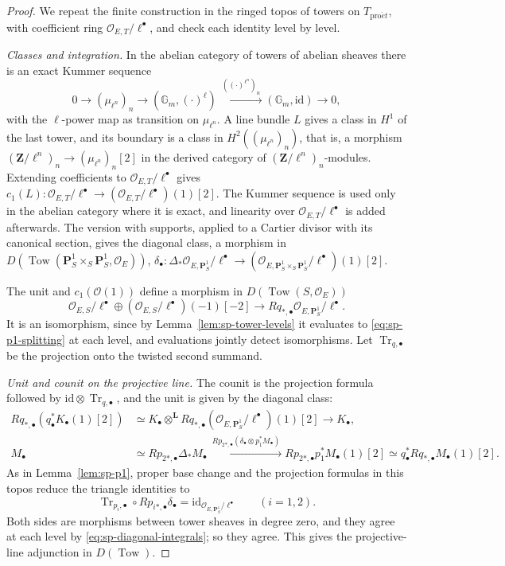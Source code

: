 \documentclass[11pt,a4paper]{article}
\numberwithin{equation}{section}
\theoremstyle{definition}
\theoremstyle{remark}
\newcommand{\proet}{\mathrm{pro}\acute{e}t}
\begin{document}
\begin{proof}
We repeat the finite construction in the ringed topos of towers on
$T_{\proet}$, with coefficient ring $\mathcal O_{E,T}/\ell^\bullet$,
and check each identity level by level.

\emph{Classes and integration.} In the abelian category of towers of
abelian sheaves there is an exact Kummer sequence
\[
 0\longrightarrow(\mu_{\ell^n})_n
 \longrightarrow(\mathbb G_m,(\cdot)^\ell)
 \xrightarrow{\ ((\cdot)^{\ell^n})_n\ }
 (\mathbb G_m,\mathrm{id})\longrightarrow0,
\]
with the $\ell$-power map as transition on $\mu_{\ell^n}$. A line bundle
$L$ gives a class in $H^1$ of the last tower, and its boundary is a class
in $H^2((\mu_{\ell^n})_n)$, that is, a morphism
$(\mathbf Z/\ell^n)_n\to(\mu_{\ell^n})_n[2]$ in the derived category of
$(\mathbf Z/\ell^n)_n$-modules. Extending coefficients to $\mathcal O_{E,T}/\ell^\bullet$ gives
$c_1(L):\mathcal O_{E,T}/\ell^\bullet\to (\mathcal O_{E,T}/\ell^\bullet)(1)[2]$. The Kummer sequence is used only in the
abelian category where it is exact, and linearity over $\mathcal O_{E,T}/\ell^\bullet$ is added
afterwards. The version with supports, applied to a Cartier divisor with
its canonical section, gives the diagonal class, a morphism in
$D(\operatorname{Tow}(\mathbf P^1_S\times_S\mathbf P^1_S,\mathcal O_E))$,
$\delta_\bullet:\Delta_*\mathcal O_{E,\mathbf P^1_S}/\ell^\bullet\to
(\mathcal O_{E,\mathbf P^1_S\times_S\mathbf P^1_S}/\ell^\bullet)(1)[2]$.

The unit and $c_1(\mathcal O(1))$ define a morphism in
$D(\operatorname{Tow}(S,\mathcal O_E))$
\[
 \mathcal O_{E,S}/\ell^\bullet\oplus (\mathcal O_{E,S}/\ell^\bullet)(-1)[-2]\longrightarrow
 Rq_{*,\bullet}\mathcal O_{E,\mathbf P^1_S}/\ell^\bullet.
\]
It is an isomorphism, since by Lemma~\ref{lem:sp-tower-levels} it
evaluates to \eqref{eq:sp-p1-splitting} at each level, and evaluations
jointly detect isomorphisms. Let $\operatorname{Tr}_{q,\bullet}$ be the
projection onto the twisted second summand.

\emph{Unit and counit on the projective line.} The counit is the
projection formula followed by $\mathrm{id}\otimes\operatorname{Tr}_{q,\bullet}$,
and the unit is given by the diagonal class:
\[
 \begin{aligned}
 Rq_{*,\bullet}(q_\bullet^*K_\bullet(1)[2])
 &\simeq K_\bullet\otimes^{\mathbf L}
 Rq_{*,\bullet}(\mathcal O_{E,\mathbf P^1_S}/\ell^\bullet)(1)[2]
 \longrightarrow K_\bullet,\\
 M_\bullet&\simeq Rp_{2*,\bullet}\Delta_*M_\bullet
 \xrightarrow{\ Rp_{2*,\bullet}(\delta_\bullet\otimes p_1^*M_\bullet)\ }
 Rp_{2*,\bullet}p_1^*M_\bullet(1)[2]
 \simeq q_\bullet^*Rq_{*,\bullet}M_\bullet(1)[2].
 \end{aligned}
\]
As in Lemma~\ref{lem:sp-p1}, proper base change and the projection
formulas in this topos reduce the triangle identities to
\[
 \operatorname{Tr}_{p_i,\bullet}\circ Rp_{i*,\bullet}\delta_\bullet
 =\mathrm{id}_{\mathcal O_{E,\mathbf P^1_S}/\ell^\bullet}\qquad(i=1,2).
\]
Both sides are morphisms between tower sheaves in degree zero, and they
agree at each level by \eqref{eq:sp-diagonal-integrals}; so they agree.
This gives the projective-line adjunction in $D(\operatorname{Tow})$.


\end{proof}
\end{document}
